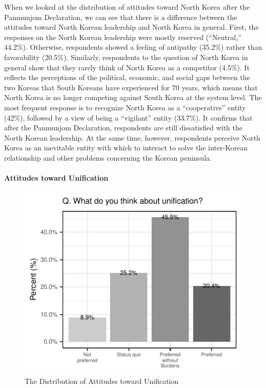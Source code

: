 \documentclass[letterpaper,9pt,twocolumn,twoside,]{pinp}
\begin{document}
When we looked at the distribution of attitudes toward North Korea after
the Panmunjom Declaration, we can see that there is a difference between
the attitudes toward North Korean leadership and North Korea in general.
First, the responses on the North Korean leadership were mostly reserved
(``Neutral,'' 44.2\%). Otherwise, respondents showed a feeling of
antipathy (35.2\%) rather than favorability (20.5\%). Similarly,
respondents to the question of North Korea in general show that they
rarely think of North Korea as a competitor (4.5\%). It reflects the
perceptions of the political, economic, and social gaps between the two
Koreas that South Koreans have experienced for 70 years, which means
that North Korea is no longer competing against South Korea at the
system level. The most frequent response is to recognize North Korea as
a ``cooperative'' entity (42\%), followed by a view of being a
``vigilant'' entity (33.7\%). It confirms that after the Panmunjom
Declaration, respondents are still dissatisfied with the North Korean
leadership. At the same time, however, respondents perceive North Korea
as an inevitable entity with which to interact to solve the inter-Korean
relationship and other problems concerning the Korean peninsula.

\hypertarget{attitudes-toward-unification}{%
\paragraph{Attitudes toward
Unification}\label{attitudes-toward-unification}}

\begin{figure}[htbp]

{\centering \includegraphics{manuscript_files/figure-latex/fig4-1} 

}

\caption{\label{fig4} The Distribution of Attitudes toward Unification}\label{fig:fig4}
\end{figure}
\end{document}
